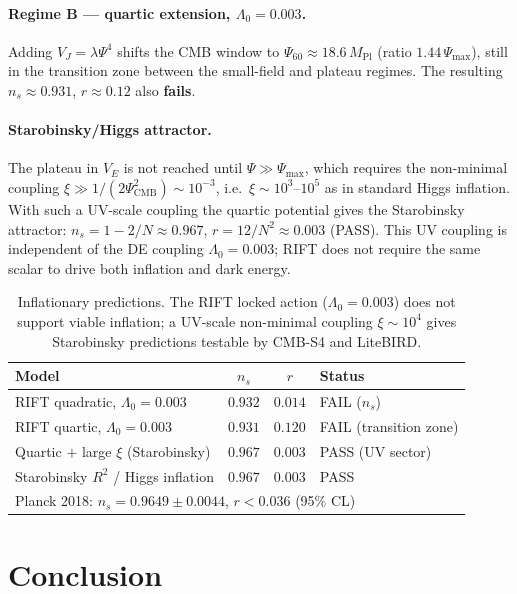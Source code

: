 \documentclass[12pt,a4paper]{article}
\begin{document}
\paragraph{Regime B — quartic extension, $\Lambda_0=0.003$.}
Adding $V_J=\lambda\Psi^4$ shifts the CMB window to $\Psi_{60}\approx18.6\,M_\mathrm{Pl}$
(ratio $1.44\,\Psi_\mathrm{max}$), still in the transition zone between the
small-field and plateau regimes.  The resulting $n_s\approx0.931$, $r\approx0.12$
also \textbf{fails}.

\paragraph{Starobinsky/Higgs attractor.}
The plateau in $V_E$ is not reached until $\Psi\gg\Psi_\mathrm{max}$, which
requires the non-minimal coupling $\xi\gg1/(2\Psi_\mathrm{CMB}^2)\sim10^{-3}$,
i.e.\ $\xi\sim10^3$--$10^5$ as in standard Higgs inflation.  With such a
UV-scale coupling the quartic potential gives the Starobinsky attractor:
$n_s=1-2/N\approx0.967$, $r=12/N^2\approx0.003$ (PASS).  This UV coupling
is independent of the DE coupling $\Lambda_0=0.003$; RIFT does not require
the same scalar to drive both inflation and dark energy.

\begin{table}[h]
\centering
\begin{tabular}{lccl}
\hline
Model & $n_s$ & $r$ & Status \\
\hline
RIFT quadratic, $\Lambda_0=0.003$ & $0.932$ & $0.014$ & FAIL ($n_s$) \\
RIFT quartic, $\Lambda_0=0.003$ & $0.931$ & $0.120$ & FAIL (transition zone) \\
Quartic $+$ large $\xi$ (Starobinsky) & $0.967$ & $0.003$ & PASS (UV sector) \\
Starobinsky $R^2$ / Higgs inflation & $0.967$ & $0.003$ & PASS \\
\hline
\multicolumn{4}{l}{Planck 2018: $n_s=0.9649\pm0.0044$, $r<0.036$ (95\% CL)} \\
\hline
\end{tabular}
\caption{Inflationary predictions. The RIFT locked action ($\Lambda_0=0.003$)
does not support viable inflation; a UV-scale non-minimal coupling $\xi\sim10^4$
gives Starobinsky predictions testable by CMB-S4 and LiteBIRD.}
\label{tab:inflation}
\end{table}

\section{Conclusion}
\label{sec:conclusion}
\end{document}
